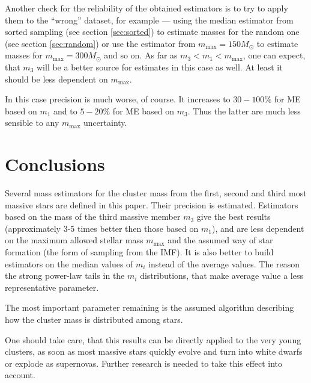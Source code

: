 \documentclass[a4paper,10pt]{article}
\newcommand{\MSun}{M_\odot}
\newcommand{\Mmax}{m_{\mathrm{max}}}
\begin{document}
Another check for the reliability of the obtained estimators is to try to apply them to the ``wrong'' dataset, for example --- using the median estimator from sorted sampling (see section \ref{sec:sorted}) to estimate masses for the random one (see section \ref{sec:random}) or use the estimator from $\Mmax = 150 \MSun$ to estimate masses for $\Mmax = 300 \MSun$ and so on. As far as $m_3 < m_1 < \Mmax$, one can expect, that $m_3$ will be a better source for estimates in this case as well. At least 
it should be less dependent on $\Mmax$.

In this case precision is much worse, of course. It increases to $30-100\%$ for ME based on $m_1$ and to $5-20 \%$ for ME based on $m_3$. 
Thus the latter are much less sensible to any $\Mmax$ uncertainty.


\section{Conclusions}

Several mass estimators for the cluster mass from the first, second and third most massive stars are defined in this paper. Their precision is estimated. Estimators based on the mass of the third massive member $m_3$ 
give the best results (approximately 3-5 times better then those based on $m_1$), and are less dependent on the maximum allowed stellar mass $\Mmax$ and the assumed way of star formation (the form of sampling from the IMF). 
It is also better to build estimators on the median values of $m_i$ instead of the average values. The reason the strong power-law tails in the  $m_i$ distributions, that make average value a less representative parameter.

The most important parameter remaining is the assumed algorithm describing how the cluster mass is distributed among stars.

One should take care, that this results can be directly applied to the very young clusters, as soon as most massive stars quickly
evolve and turn into white dwarfs or explode as supernovas. Further research is needed to take this effect into account.




\end{document}
